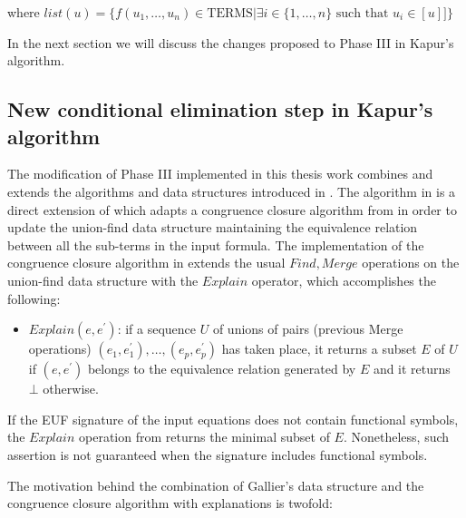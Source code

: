 where $list(u) = \{ f(u_1, \dots, u_n) \in \text{TERMS} 
| \exists i \in \{1, \dots, n\} \text{ such that } u_i \in [u] ] \}$

In the next section we will discuss the changes proposed to 
Phase III in Kapur's algorithm. 

\subsection{New conditional elimination 
step in Kapur's algorithm}

The modification of Phase III implemented in this thesis work
combines and extends the algorithms and data structures introduced
in \cite{GALLIER1987233, 10.1007/978-3-540-32033-3_33}.
The algorithm in \cite{GALLIER1987233} is a direct
extension of \cite{DOWLING1984267} which adapts a 
congruence closure algorithm from 
\cite{10.1145/322186.322198, 10.1145/322217.322228} in order
to update the union-find data structure maintaining the
equivalence relation between all the sub-terms in the input
formula. The implementation of the congruence closure
algorithm in \cite{10.1007/978-3-540-32033-3_33}
extends the usual $Find, Merge$ operations on the 
union-find data structure with the $Explain$ operator, 
which accomplishes the following:

\begin{itemize} \label{explain_def}
  \item[] $Explain(e, e^{'})$: if a sequence $U$ of
    unions of pairs (previous Merge operations) 
    $(e_1, e_1^{'}), \dots, (e_p, e_p^{'})$
    has taken place, it returns a subset $E$
    of $U$ if $(e, e^{'})$ belongs to the equivalence
    relation generated by $E$ and it returns $\bot$
    otherwise.
\end{itemize}

If the EUF signature of the input 
equations does not contain functional symbols, 
the $Explain$ operation from \cite{10.1007/978-3-540-32033-3_33} 
returns the minimal subset of $E$. Nonetheless, such
assertion is not guaranteed when the signature
includes functional symbols.

The motivation behind the combination of 
Gallier's data structure and the congruence 
closure algorithm with explanations is twofold: 

